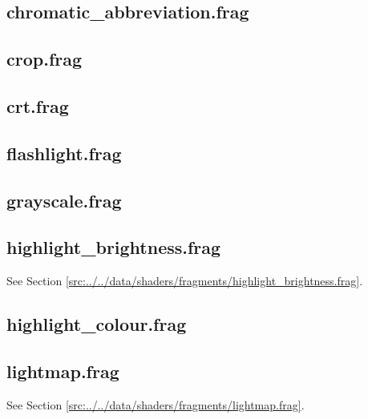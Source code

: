 \documentclass[../main/main.tex]{subfiles}
\begin{document}
\subsection{chromatic\_abbreviation.frag}

\label{src:data/shaders/fragments/chromatic_abbreviation.frag}

\subsection{crop.frag}

\label{src:data/shaders/fragments/crop.frag}

\subsection{crt.frag}

\label{src:data/shaders/fragments/crt.frag}

\subsection{flashlight.frag}

\label{src:data/shaders/fragments/flashlight.frag}

\subsection{grayscale.frag}

\label{src:data/shaders/fragments/grayscale.frag}

\subsection{highlight\_brightness.frag}
See Section \ref{src:../../data/shaders/fragments/highlight_brightness.frag}.

\subsection{highlight\_colour.frag}

\label{src:data/shaders/fragments/highlight_colour.frag}

\subsection{lightmap.frag}
See Section \ref{src:../../data/shaders/fragments/lightmap.frag}.
\end{document}
